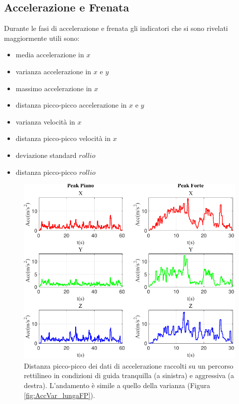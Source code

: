 \documentclass[class=article]{standalone}
\begin{document}
	\subsection{Accelerazione e Frenata}
	Durante le fasi di accelerazione e frenata gli indicatori che si sono rivelati maggiormente utili sono:
	\begin{itemize}
		\item media accelerazione in \(x\)
		\item varianza accelerazione in \(x\) e \(y\)
		\item massimo accelerazione in \(x\)
		\item distanza picco-picco accelerazione in \(x\) e \(y\)
		\item varianza velocità in \(x\)
		\item distanza picco-picco velocità in \(x\)
		\item deviazione standard \(rollio\)
		\item distanza picco-picco \(rollio\)
	\end{itemize}
	
	\begin{center}
		\begin{figure}[h!]
			\centering\includegraphics[width=.7\textwidth]{img/lungaFP/Acc/Peak}
			\caption[]{Distanza picco-picco dei dati di accelerazione raccolti su un percorso rettilineo in condizioni di guida tranquilla (a sinistra) e aggressiva (a destra). L'andamento è simile a quello della varianza (Figura \ref{fig:AccVar_lungaFP}).}
			\label{fig:AccPeak_lungaFP}
		\end{figure}
	\end{center}
		
\end{document}
